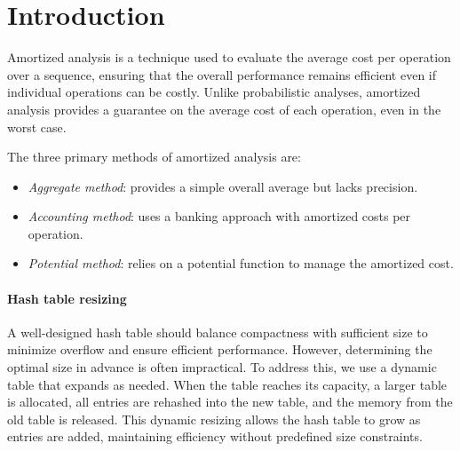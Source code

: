 \section{Introduction}

Amortized analysis is a technique used to evaluate the average cost per operation over a sequence, ensuring that the overall performance remains efficient even if individual operations can be costly. 
Unlike probabilistic analyses, amortized analysis provides a guarantee on the average cost of each operation, even in the worst case.

The three primary methods of amortized analysis are:
\begin{itemize}
    \item \textit{Aggregate method}: provides a simple overall average but lacks precision.
    \item \textit{Accounting method}: uses a banking approach with amortized costs per operation.
    \item \textit{Potential method}: relies on a potential function to manage the amortized cost.
\end{itemize}

\paragraph*{Hash table resizing}
A well-designed hash table should balance compactness with sufficient size to minimize overflow and ensure efficient performance. 
However, determining the optimal size in advance is often impractical. 
To address this, we use a dynamic table that expands as needed. When the table reaches its capacity, a larger table is allocated, all entries are rehashed into the new table, and the memory from the old table is released. 
This dynamic resizing allows the hash table to grow as entries are added, maintaining efficiency without predefined size constraints.